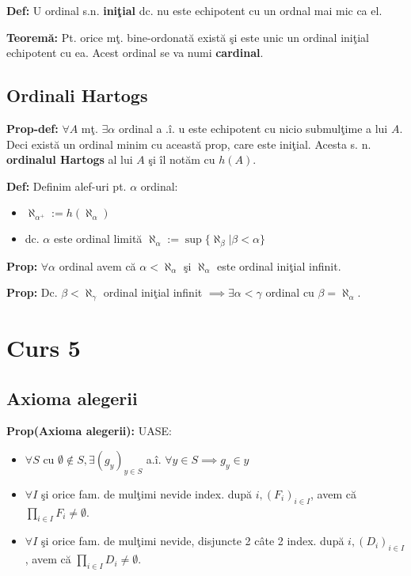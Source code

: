 \documentclass{article}
\begin{document}
\textbf{Def:} U ordinal s.n. \textbf{ini\c tial} dc. nu este echipotent cu un ordnal mai mic ca el.

\textbf{Teorem\u a:} Pt. orice m\c t. bine-ordonat\u a exist\u a \c si este unic un ordinal ini\c tial echipotent cu ea. Acest ordinal se va numi \textbf{cardinal}.

\subsection{Ordinali Hartogs}

\textbf{Prop-def:} $\forall A$ m\c t. $\exists \alpha$ ordinal a .\^ i. u este echipotent cu nicio submul\c time a lui $A$. Deci exist\u a un ordinal minim cu aceast\u a prop, care este ini\c tial. Acesta s. n. \textbf{ordinalul Hartogs} al lui $A$ \c si \^ il not\u am cu \textbf{$h(A)$}.

\textbf{Def:} Definim alef-uri pt. $\alpha$ ordinal:
\begin{itemize}
    \item $\aleph_{\alpha^+}:=h(\aleph_\alpha)$
    \item dc. $\alpha$ este ordinal limit\u a $\aleph_\alpha:=\sup\{\aleph_\beta|\beta<\alpha\}$
\end{itemize}

\textbf{Prop:} $\forall \alpha$ ordinal avem c\u a $\alpha<\aleph_\alpha$ \c si $\aleph_\alpha$ este ordinal ini\c tial infinit.

\textbf{Prop:} Dc. $\beta<\aleph_\gamma$ ordinal ini\c tial infinit $\implies \exists \alpha<\gamma$ ordinal cu $\beta=\aleph_\alpha$.

\section{Curs 5}

\subsection{Axioma alegerii}

\textbf{Prop(Axioma alegerii):} UASE:
\begin{itemize}
    \item $\forall S$ cu $\emptyset \notin S, \exists (g_y)_{y\in S}$ a.\^ i. $\forall y\in S \implies g_y\in y$
    \item $\forall I$ \c si orice fam. de mul\c timi nevide index. dup\u a $i, (F_i)_{i\in I}$, avem c\u a $\prod_{i\in I}F_i \neq \emptyset$.
    \item $\forall I$ \c si orice fam. de mul\c timi nevide, disjuncte 2 c\^ ate 2 index. dup\u a $i, (D_i)_{i\in I}$, avem c\u a $\prod_{i\in I}D_i \neq \emptyset$.
\end{itemize}
\end{document}
